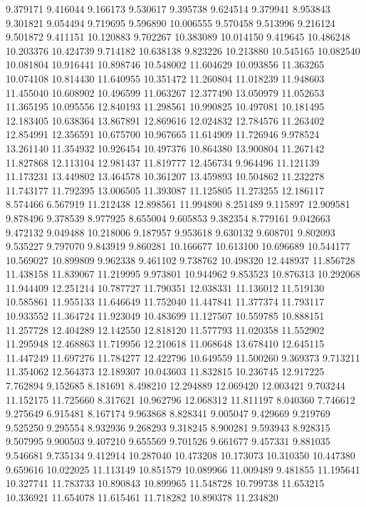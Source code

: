 9.379171
9.416044
9.166173
9.530617
9.395738
9.624514
9.379941
8.953843
9.301821
9.054494
9.719695
9.596890
10.006555
9.570458
9.513996
9.216124
9.501872
9.411151
10.120883
9.702267
10.383089
10.014150
9.419645
10.486248
10.203376
10.424739
9.714182
10.638138
9.823226
10.213880
10.545165
10.082540
10.081804
10.916441
10.898746
10.548002
11.604629
10.093856
11.363265
10.074108
10.814430
11.640955
10.351472
11.260804
11.018239
11.948603
11.455040
10.608902
10.496599
11.063267
12.377490
13.050979
11.052653
11.365195
10.095556
12.840193
11.298561
10.990825
10.497081
10.181495
12.183405
10.638364
13.867891
12.869616
12.024832
12.784576
11.263402
12.854991
12.356591
10.675700
10.967665
11.614909
11.726946
9.978524
13.261140
11.354932
10.926454
10.497376
10.864380
13.900804
11.267142
11.827868
12.113104
12.981437
11.819777
12.456734
9.964496
11.121139
11.173231
13.449802
13.464578
10.361207
13.459893
10.504862
11.232278
11.743177
11.792395
13.006505
11.393087
11.125805
11.273255
12.186117
8.574466
6.567919
11.212438
12.898561
11.994890
8.251489
9.115897
12.909581
9.878496
9.378539
8.977925
8.655004
9.605853
9.382354
8.779161
9.042663
9.472132
9.049488
10.218006
9.187957
9.953618
9.630132
9.608701
9.802093
9.535227
9.797070
9.843919
9.860281
10.166677
10.613100
10.696689
10.544177
10.569027
10.899809
9.962338
9.461102
9.738762
10.498320
12.448937
11.856728
11.438158
11.839067
11.219995
9.973801
10.944962
9.853523
10.876313
10.292068
11.944409
12.251214
10.787727
11.790351
12.038331
11.136012
11.519130
10.585861
11.955133
11.646649
11.752040
11.447841
11.377374
11.793117
10.933552
11.364724
11.923049
10.483699
11.127507
10.559785
10.888151
11.257728
12.404289
12.142550
12.818120
11.577793
11.020358
11.552902
11.295948
12.468863
11.719956
12.210618
11.068648
13.678410
12.645115
11.447249
11.697276
11.784277
12.422796
10.649559
11.500260
9.369373
9.713211
11.354062
12.564373
12.189307
10.043603
11.832815
10.236745
12.917225
7.762894
9.152685
8.181691
8.498210
12.294889
12.069420
12.003421
9.703244
11.152175
11.725660
8.317621
10.962796
12.068312
11.811197
8.040360
7.746612
9.275649
6.915481
8.167174
9.963868
8.828341
9.005047
9.429669
9.219769
9.525250
9.295554
8.932936
9.268293
9.318245
8.900281
9.593943
8.928315
9.507995
9.900503
9.407210
9.655569
9.701526
9.661677
9.457331
9.881035
9.546681
9.735134
9.412914
10.287040
10.473208
10.173073
10.310350
10.447380
9.659616
10.022025
11.113149
10.851579
10.089966
11.009489
9.481855
11.195641
10.327741
11.783733
10.890843
10.899965
11.548728
10.799738
11.653215
10.336921
11.654078
11.615461
11.718282
10.890378
11.234820
